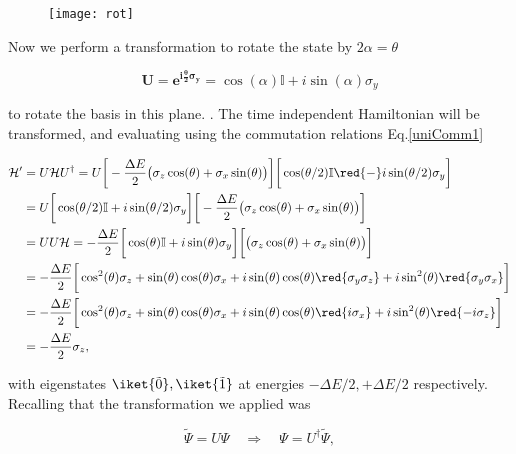 \begin{figure}[h]
  \centering \texttt{[image: rot]}
\end{figure}

\noindent

\noindent Now we perform a transformation to rotate the state by $ 2\alpha = \theta $

  \begin{equation}
    \mathbf{U=e^{i\frac{\theta}{2}\sigma_y}} =  \cos(\alpha)\mathbb{I}+i\sin(\alpha)\sigma_y
  \end{equation}

  \noindent to  rotate the basis in  this plane.  .   The {time independent  Hamiltonian} will be transformed,  and evaluating using  the commutation
  relations Eq.\eqref{uniComm1}

  \begin{equation}\label{uniRot}
    \begin{aligned}
      \mathcal{H}' & = U\mathcal{H}U^{\dagger} = U \bigg[-\frac{\Delta E}{2}\big(\sigma_z\cos(\theta)+\sigma_x\sin(\theta)\big)\bigg]\bigg[\cos(\theta/2)\mathbb{I}\red{-}i\sin(\theta/2)\sigma_y\bigg]\\
      & = U \bigg[\cos(\theta/2)\mathbb{I}+i\sin(\theta/2)\sigma_y\bigg]\bigg[-\frac{\Delta E}{2}\big(\sigma_z\cos(\theta)+\sigma_x\sin(\theta)\big)\bigg]\\
      & = UU\mathcal{H} =-\frac{\Delta E}{2} \bigg[\cos(\theta)\mathbb{I}+i\sin(\theta)\sigma_y\bigg]\bigg[\big(\sigma_z\cos(\theta)+\sigma_x\sin(\theta)\big)\bigg]\\
      & = -\frac{\Delta E}{2}\bigg[\cos^2(\theta)\sigma_z+\sin(\theta)\cos(\theta)\sigma_x+i\sin(\theta)\cos(\theta)\red{\sigma_y\sigma_z}+i\sin^2(\theta)\red{\sigma_y\sigma_x}\bigg]\\
      & = -\frac{\Delta E}{2}\bigg[\cos^2(\theta)\sigma_z+\sin(\theta)\cos(\theta)\sigma_x+i\sin(\theta)\cos(\theta)\red{i\sigma_x}+i\sin^2(\theta)\red{-i\sigma_z}\bigg]\\
      & = -\frac{\Delta E}{2}\sigma_z,
    \end{aligned}
  \end{equation}


  \noindent  with  eigenstates  $ \iket{\tilde{0}},  \iket{\tilde{1}}  $  at  energies  $  -\Delta E/2,  +\Delta  E/2  $
  respectively.  Recalling that the transformation we applied was

  \begin{equation}\label{uniTransform}
    \tilde{\Psi} = U\Psi \quad\Rightarrow\quad \Psi = U^{\dagger}\tilde{\Psi},
  \end{equation}

